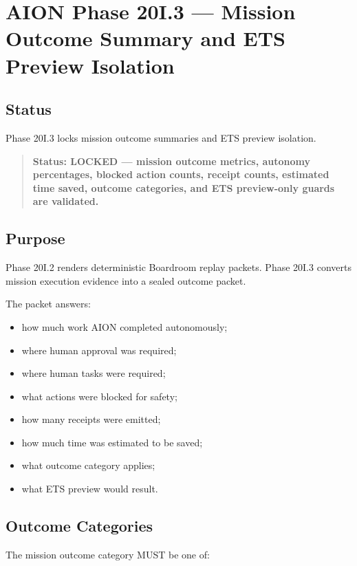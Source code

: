 \section{AION Phase 20I.3 --- Mission Outcome Summary and ETS Preview Isolation}
\label{sec:aion-phase20i3-mission-outcome-ets-preview}

\subsection{Status}

Phase 20I.3 locks mission outcome summaries and ETS preview isolation.

\begin{quote}
\textbf{Status: LOCKED --- mission outcome metrics, autonomy percentages, blocked action counts, receipt counts, estimated time saved, outcome categories, and ETS preview-only guards are validated.}
\end{quote}

\subsection{Purpose}

Phase 20I.2 renders deterministic Boardroom replay packets. Phase 20I.3 converts mission execution evidence into a sealed outcome packet.

The packet answers:

\begin{itemize}
  \item how much work AION completed autonomously;
  \item where human approval was required;
  \item where human tasks were required;
  \item what actions were blocked for safety;
  \item how many receipts were emitted;
  \item how much time was estimated to be saved;
  \item what outcome category applies;
  \item what ETS preview would result.
\end{itemize}

\subsection{Outcome Categories}

The mission outcome category MUST be one of:

